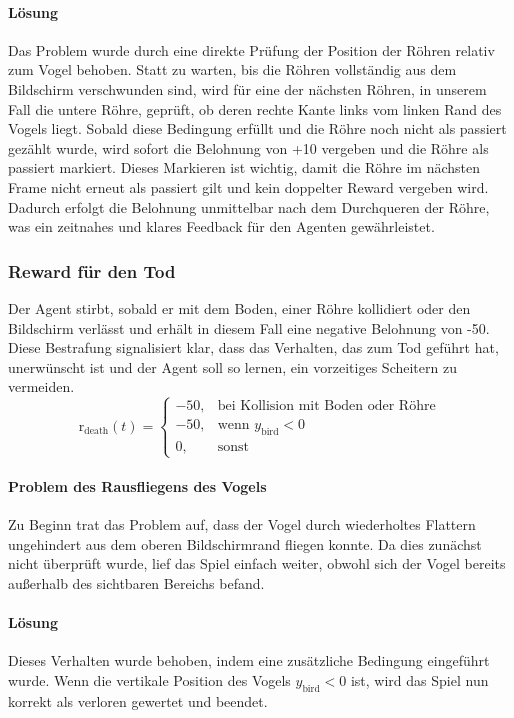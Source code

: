 \documentclass[conference]{IEEEtran}
\begin{document}
\paragraph{Lösung}
Das Problem wurde durch eine direkte Prüfung der Position der Röhren relativ zum Vogel behoben. Statt zu warten, bis die Röhren vollständig aus dem Bildschirm verschwunden sind, wird für eine der nächsten Röhren, in unserem Fall die untere Röhre, geprüft, ob deren rechte Kante links vom linken Rand des Vogels liegt. Sobald diese Bedingung erfüllt und die Röhre noch nicht als passiert gezählt wurde, wird sofort die Belohnung von +10 vergeben und die Röhre als passiert markiert. Dieses Markieren ist wichtig, damit die Röhre im nächsten Frame nicht erneut als passiert gilt und kein doppelter Reward vergeben wird. Dadurch erfolgt die Belohnung unmittelbar nach dem Durchqueren der Röhre, was ein zeitnahes und klares Feedback für den Agenten gewährleistet.\\

\subsubsection{Reward für den Tod}\label{reward_design_third}
Der Agent stirbt, sobald er mit dem Boden, einer Röhre kollidiert oder den Bildschirm verlässt und erhält in diesem Fall eine negative Belohnung von -50. Diese Bestrafung signalisiert klar, dass das Verhalten, das zum Tod geführt hat, unerwünscht ist und der Agent soll so lernen, ein vorzeitiges Scheitern zu vermeiden.
\begin{equation}
	\text{r}_{\text{death}}(t) =
	\begin{cases}
		-50, & \text{bei Kollision mit Boden oder Röhre} \\
		-50, & \text{wenn } y_{\text{bird}} < 0 \\
		0,    & \text{sonst}
	\end{cases}
\end{equation}

\paragraph{Problem des Rausfliegens des Vogels}
Zu Beginn trat das Problem auf, dass der Vogel durch wiederholtes Flattern ungehindert aus dem oberen Bildschirmrand fliegen konnte. Da dies zunächst nicht überprüft wurde, lief das Spiel einfach weiter, obwohl sich der Vogel bereits außerhalb des sichtbaren Bereichs befand. 

\paragraph{Lösung}
Dieses Verhalten wurde behoben, indem eine zusätzliche Bedingung eingeführt wurde. Wenn die vertikale Position des Vogels \( y_{\text{bird}} < 0 \) ist, wird das Spiel nun korrekt als verloren gewertet und beendet.
\end{document}
